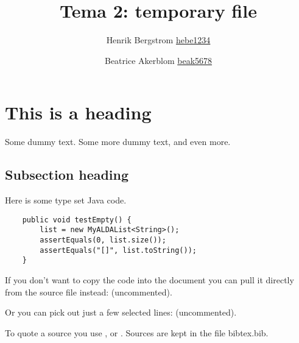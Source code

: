 \documentclass[a5paper,10pt,oneside]{article}
\title{Tema 2: temporary file}
\author{Henrik Bergstrom \url{hebe1234} \and Beatrice Akerblom \url{beak5678}}
\begin{document}
\maketitle


\section{This is a heading}

Some dummy text. Some more dummy text, and even more. 

\subsection{Subsection heading}

Here is some type set Java code. 

\begin{lstlisting}
	public void testEmpty() {
		list = new MyALDAList<String>();
		assertEquals(0, list.size());
		assertEquals("[]", list.toString());
	}
\end{lstlisting}

If you don't want to copy the code into the document you can pull it directly from the source file instead:
(uncommented).
%

Or you can pick out just a few selected lines:
(uncommented).
%

To quote a source you use \cite{Weiss}, or \cite[sid. 25]{Weiss}. Sources are kept in the file bibtex.bib.



\end{document}
